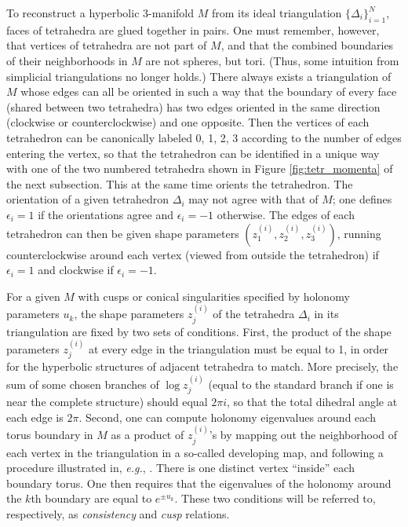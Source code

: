 \documentclass[hyper]{JHEP3}
\begin{document}
To reconstruct a hyperbolic 3-manifold $M$ from its ideal triangulation $\{\Delta_i\}_{i=1}^N$,
faces of tetrahedra are glued together in pairs.
One must remember, however, that vertices of tetrahedra are not part of $M$,
and that the combined boundaries of their neighborhoods in $M$ are not spheres, but tori.
(Thus, some intuition from simplicial triangulations no longer holds.)
%
There always exists a triangulation of $M$ whose edges can all be oriented in such a way that the boundary of every face (shared between two tetrahedra) has two edges oriented in the same direction (clockwise or counterclockwise) and one opposite. Then the vertices of each tetrahedron can be canonically labeled 0, 1, 2, 3 according to the number of edges entering the vertex, so that the tetrahedron can be identified in a unique way with one of the two numbered tetrahedra shown in Figure \ref{fig:tetr_momenta} of the next subsection. This at the same time orients the tetrahedron. The orientation of a given tetrahedron $\Delta_i$ may not agree with that of $M$; one defines $\epsilon_i=1$ if the orientations agree and $\epsilon_i=-1$ otherwise. The edges of each tetrahedron can then be given shape parameters $(z^{(i)}_1,z^{(i)}_2,z^{(i)}_3)$, running counterclockwise around each vertex (viewed from outside the tetrahedron) if $\epsilon_i=1$ and clockwise if $\epsilon_i=-1$.


For a given $M$ with cusps or conical singularities
specified by holonomy parameters $u_k$, the shape parameters $z_j^{(i)}$ of the tetrahedra $\Delta_i$
in its triangulation are fixed by two sets of conditions.
First, the product of the shape parameters $z_j^{(i)}$
at every edge in the triangulation must be equal to 1,
in order for the hyperbolic structures of adjacent tetrahedra to match.
More precisely, the sum of some chosen branches of $\log z_j^{(i)}$ (equal to the standard branch if one is near the complete structure) should equal $2\pi i$, so that the total dihedral angle at each edge is $2\pi$.
Second, one can compute holonomy eigenvalues around each torus boundary
in $M$ as a product of $z_j^{(i)}$'s by mapping out the neighborhood
of each vertex in the triangulation in a so-called developing map,
and following a procedure illustrated in, {\it e.g.}, \cite{nz-1985}.
There is one distinct vertex ``inside'' each boundary torus.
One then requires that the eigenvalues of the holonomy around the $k$th boundary are equal to $e^{\pm u_k}$.
These two conditions will be referred to, respectively,
as {\it consistency} and {\it cusp} relations.
\end{document}
